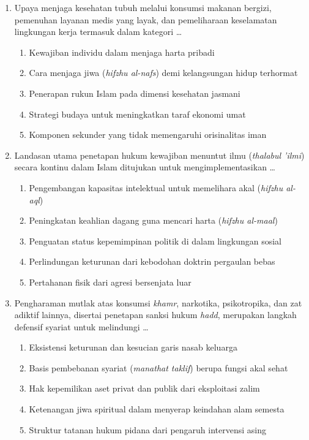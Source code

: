 \documentclass[12pt,a4paper]{article}
\begin{document}
\begin{enumerate}[leftmargin=*]
\item Upaya menjaga kesehatan tubuh melalui konsumsi makanan bergizi, pemenuhan layanan medis yang layak, dan pemeliharaan keselamatan lingkungan kerja termasuk dalam kategori \dots
    \begin{enumerate}[label=\alph*.]
        \item Kewajiban individu dalam menjaga harta pribadi
        \item Cara menjaga jiwa (\textit{hifzhu al-nafs}) demi kelangsungan hidup terhormat
        \item Penerapan rukun Islam pada dimensi kesehatan jasmani
        \item Strategi budaya untuk meningkatkan taraf ekonomi umat
        \item Komponen sekunder yang tidak memengaruhi orisinalitas iman
    \end{enumerate}

\item Landasan utama penetapan hukum kewajiban menuntut ilmu (\textit{thalabul 'ilmi}) secara kontinu dalam Islam ditujukan untuk mengimplementasikan \dots
    \begin{enumerate}[label=\alph*.]
        \item Pengembangan kapasitas intelektual untuk memelihara akal (\textit{hifzhu al-aql})
        \item Peningkatan keahlian dagang guna mencari harta (\textit{hifzhu al-maal})
        \item Penguatan status kepemimpinan politik di dalam lingkungan sosial
        \item Perlindungan keturunan dari kebodohan doktrin pergaulan bebas
        \item Pertahanan fisik dari agresi bersenjata luar
    \end{enumerate}

\item Pengharaman mutlak atas konsumsi \textit{khamr}, narkotika, psikotropika, dan zat adiktif lainnya, disertai penetapan sanksi hukum \textit{hadd}, merupakan langkah defensif syariat untuk melindungi \dots
    \begin{enumerate}[label=\alph*.]
        \item Eksistensi keturunan dan kesucian garis nasab keluarga
        \item Basis pembebanan syariat (\textit{manathat taklif}) berupa fungsi akal sehat
        \item Hak kepemilikan aset privat dan publik dari eksploitasi zalim
        \item Ketenangan jiwa spiritual dalam menyerap keindahan alam semesta
        \item Struktur tatanan hukum pidana dari pengaruh intervensi asing
    \end{enumerate}


\end{enumerate}
\end{document}
